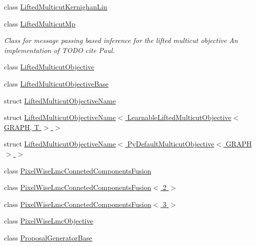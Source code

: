 \begin{DoxyCompactItemize}
\item 
class \hyperlink{classnifty_1_1graph_1_1opt_1_1lifted__multicut_1_1LiftedMulticutKernighanLin}{Lifted\+Multicut\+Kernighan\+Lin}
\item 
class \hyperlink{classnifty_1_1graph_1_1opt_1_1lifted__multicut_1_1LiftedMulticutMp}{Lifted\+Multicut\+Mp}
\begin{DoxyCompactList}\small\item\em Class for message passing based inference for the lifted multicut objective An implementation of T\+O\+DO cite Paul. \end{DoxyCompactList}\item 
class \hyperlink{classnifty_1_1graph_1_1opt_1_1lifted__multicut_1_1LiftedMulticutObjective}{Lifted\+Multicut\+Objective}
\item 
class \hyperlink{classnifty_1_1graph_1_1opt_1_1lifted__multicut_1_1LiftedMulticutObjectiveBase}{Lifted\+Multicut\+Objective\+Base}
\item 
struct \hyperlink{structnifty_1_1graph_1_1opt_1_1lifted__multicut_1_1LiftedMulticutObjectiveName}{Lifted\+Multicut\+Objective\+Name}
\item 
struct \hyperlink{structnifty_1_1graph_1_1opt_1_1lifted__multicut_1_1LiftedMulticutObjectiveName_3_01LearnableLift9b306d43ea6163b268db721a94da381d}{Lifted\+Multicut\+Objective\+Name$<$ Learnable\+Lifted\+Multicut\+Objective$<$ G\+R\+A\+P\+H, T $>$ $>$}
\item 
struct \hyperlink{structnifty_1_1graph_1_1opt_1_1lifted__multicut_1_1LiftedMulticutObjectiveName_3_01PyDefaultMult7d81b84533086244a956eef2fae6e1d8}{Lifted\+Multicut\+Objective\+Name$<$ Py\+Default\+Multicut\+Objective$<$ G\+R\+A\+P\+H $>$ $>$}
\item 
class \hyperlink{classnifty_1_1graph_1_1opt_1_1lifted__multicut_1_1PixelWiseLmcConnetedComponentsFusion}{Pixel\+Wise\+Lmc\+Conneted\+Components\+Fusion}
\item 
class \hyperlink{classnifty_1_1graph_1_1opt_1_1lifted__multicut_1_1PixelWiseLmcConnetedComponentsFusion_3_012_01_4}{Pixel\+Wise\+Lmc\+Conneted\+Components\+Fusion$<$ 2 $>$}
\item 
class \hyperlink{classnifty_1_1graph_1_1opt_1_1lifted__multicut_1_1PixelWiseLmcConnetedComponentsFusion_3_013_01_4}{Pixel\+Wise\+Lmc\+Conneted\+Components\+Fusion$<$ 3 $>$}
\item 
class \hyperlink{classnifty_1_1graph_1_1opt_1_1lifted__multicut_1_1PixelWiseLmcObjective}{Pixel\+Wise\+Lmc\+Objective}
\item 
class \hyperlink{classnifty_1_1graph_1_1opt_1_1lifted__multicut_1_1ProposalGeneratorBase}{Proposal\+Generator\+Base}

\end{DoxyCompactItemize}
